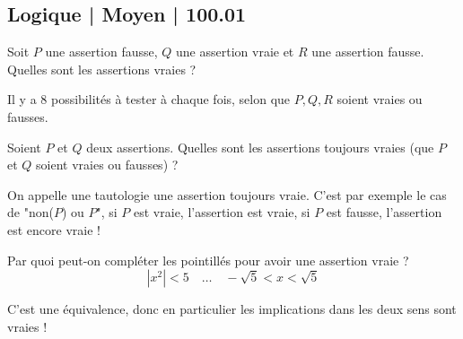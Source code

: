 \subsection{Logique | Moyen | 100.01}


\begin{question}
Soit $P$ une assertion fausse, $Q$ une assertion vraie et $R$ une assertion fausse. Quelles sont les assertions vraies ?
\begin{answers}



\end{answers}
\begin{explanations}
Il y a 8 possibilités à tester à chaque fois, selon que $P,Q,R$ soient vraies ou fausses.
\end{explanations}
\end{question}


\begin{question}
Soient $P$ et $Q$ deux assertions. Quelles sont les assertions toujours vraies (que $P$ et $Q$ soient vraies ou fausses)  ?
\begin{answers}



\end{answers}
\begin{explanations}
On appelle une tautologie une assertion toujours vraie. C'est par exemple le cas de "non($P$) ou $P$", si $P$ est vraie, l'assertion est vraie, si $P$ est fausse, l'assertion est encore vraie !
\end{explanations}
\end{question}


\begin{question}
Par quoi peut-on compléter les pointillés pour avoir une assertion vraie ?
$$|x^2| < 5 \quad \ldots \quad -\sqrt{5} < x < \sqrt{5}$$
\begin{answers}
    \good{$\Longleftarrow$}

    \good{$\implies$}

    \good{$\iff$}

\end{answers}
\begin{explanations}
C'est une équivalence, donc en particulier les implications dans les deux sens sont vraies !
\end{explanations}
\end{question}


